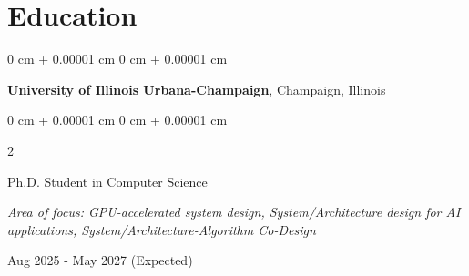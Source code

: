 \documentclass[10pt, letterpaper]{article}
\newenvironment{highlightsforbulletentries}{
    \begin{itemize}[
        topsep=0.10 cm,
        parsep=0.10 cm,
        partopsep=0pt,
        itemsep=0pt,
        leftmargin=10pt
    ]
}{
    \end{itemize}
} %
\newenvironment{onecolentry}{
    \begin{adjustwidth}{
        0 cm + 0.00001 cm
    }{
        0 cm + 0.00001 cm
    }
}{
    \end{adjustwidth}
} %
\newenvironment{twocolentry}[2][]{
    \onecolentry
    \def\secondColumn{#2}
    \setcolumnwidth{\fill, 4.5 cm}
    \begin{paracol}{2}
}{
    \switchcolumn \raggedleft \secondColumn
    \end{paracol}
    \endonecolentry
} %
\begin{document}
    









    \section{Education}
        \begin{onecolentry}
            \textbf{University of Illinois Urbana-Champaign}, Champaign, Illinois
        \end{onecolentry}
        \vspace{0.10cm}
        \begin{twocolentry} {
            Aug 2025 - May 2027 (Expected)
        }
        Ph.D. Student in Computer Science
        \vspace{0.10cm}

        \textit{Area of focus: GPU-accelerated system design, System/Architecture design for AI applications, System/Architecture-Algorithm Co-Design}
        
        \end{twocolentry}
        
\end{document}
